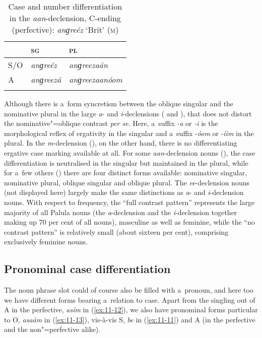 \begin{table}[p]
\caption{Case and number differentiation in the \textit{aan}-declension, C-ending (perfective): \textit{anɡreéz} `Brit' \textsc{(m)}}
\begin{tabularx}{\textwidth}{ Q Q Q }
\lsptoprule
&
\textsc{sg} &
\textsc{pl}\\\midrule
S/O &
\textit{anɡreéz} &
\textit{anɡreezaán} \\
A &
\textit{anɡreezá} &
\textit{anɡreezaanóom} \\\lspbottomrule
\end{tabularx}
\label{tab:11-aancdecl}
\end{table}


Although there is a~form syncretism between the oblique singular and the nominative plural in the large \textit{a}- and \textit{i}-declensions ( and ), that does not distort the nominative"=oblique contrast \textit{per se}. Here, a~suffix \textit{-a} or \textit{-i} is the morphological reflex of ergativity in the singular and a~suffix -\textit{óom} or -\textit{íim} in the plural. In the \textit{m}-declension (), on the other hand, there is no differentiating ergative case marking available at all. For some \textit{aan}-declension nouns (), the case differentiation is neutralised in the singular but maintained in the plural, while for a~few others () there are four distinct forms available: nominative singular, nominative plural, oblique singular and oblique plural. The \textit{ee}-declension nouns (not displayed here) largely make the same distinctions as \textit{a}- and \textit{i}-declension nouns. With respect to frequency, the ``full contrast pattern'' represents the large majority of all Palula nouns (the \textit{a}-declension and the \textit{i}-declension together making up 70 per cent of all nouns), masculine as well as feminine, while the ``no contrast pattern'' is relatively small (about sixteen per cent), comprising exclusively feminine nouns.



\subsection{Pronominal case differentiation}
\label{subsec:11-2-2}


The noun phrase slot could of course also be filled with a~pronoun, and here too we have different forms bearing a~relation to case. Apart from the singling out of A in the perfective, \textit{asím} in (\ref{ex:11-12}), we also have pronominal forms particular to O, \textit{asaám} in (\ref{ex:11-13}), vis-à-vis S, \textit{be} in (\ref{ex:11-11}) and A (in the perfective and the non"=perfective alike).

